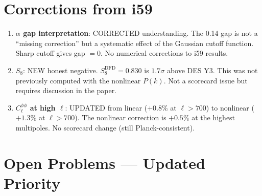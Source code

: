 \documentclass[11pt,a4paper]{article}
\begin{document}
\section{Corrections from i59}
\label{sec:corrections}

\begin{enumerate}
\item \textbf{$\alpha$ gap interpretation}: CORRECTED understanding. The 0.14 gap is not a ``missing correction'' but a systematic effect of the Gaussian cutoff function. Sharp cutoff gives gap $= 0$. No numerical corrections to i59 results.

\item \textbf{$S_8$}: NEW honest negative. $S_8^{\mathrm{DFD}} = 0.830$ is $1.7\sigma$ above DES Y3. This was not previously computed with the nonlinear $P(k)$. Not a scorecard issue but requires discussion in the paper.

\item \textbf{$C_\ell^{\phi\phi}$ at high $\ell$}: UPDATED from linear ($+0.8\%$ at $\ell > 700$) to nonlinear ($+1.3\%$ at $\ell > 700$). The nonlinear correction is $+0.5\%$ at the highest multipoles. No scorecard change (still Planck-consistent).
\end{enumerate}


\section{Open Problems --- Updated Priority}
\label{sec:open}
\end{document}
